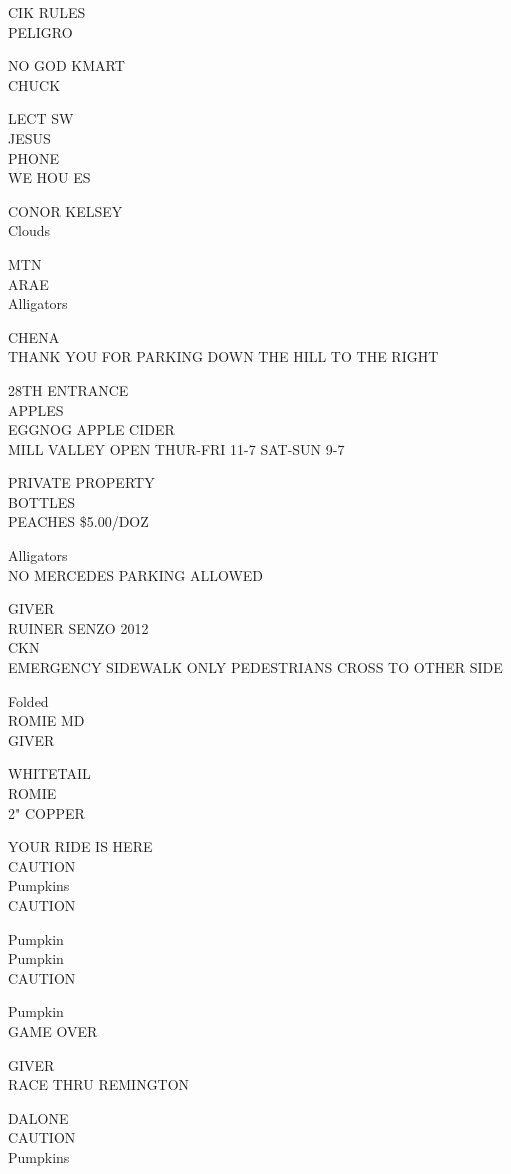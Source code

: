 \documentclass[10pt,letterpaper]{article}
\begin{document}
CIK RULES\\
PELIGRO

NO GOD KMART\\
CHUCK

LECT SW\\
JESUS\\
PHONE\\
WE HOU ES

CONOR KELSEY\\
Clouds

MTN\\
ARAE\\
Alligators

CHENA\\
THANK YOU FOR PARKING DOWN THE HILL TO THE RIGHT

28TH ENTRANCE\\
APPLES\\
EGGNOG APPLE CIDER\\
MILL VALLEY OPEN THUR{-}FRI 11{-}7 SAT{-}SUN 9{-}7

PRIVATE PROPERTY\\
BOTTLES\\
PEACHES \$5.00/DOZ

Alligators\\
NO MERCEDES PARKING ALLOWED

GIVER\\
RUINER SENZO 2012\\
CKN\\
EMERGENCY SIDEWALK ONLY PEDESTRIANS CROSS TO OTHER SIDE

Folded\\
ROMIE MD\\
GIVER

WHITETAIL\\
ROMIE\\
2" COPPER

YOUR RIDE IS HERE\\
CAUTION\\
Pumpkins\\
CAUTION

Pumpkin\\
Pumpkin\\
CAUTION

Pumpkin\\
GAME OVER

GIVER\\
RACE THRU REMINGTON

DALONE\\
CAUTION\\
Pumpkins
\end{document}
